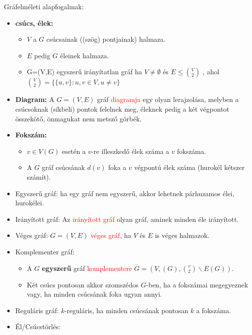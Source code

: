 \documentclass[../../szobeli.tex]{subfiles}
\begin{document}
\begin{center}
    \noindent{}
\end{center}

    Gráfelméleti alapfogalmak: 
    
    \begin{itemize}
        \item \textbf{csúcs, élek:} \begin{itemize}
            \item $V$ a $G$ csúcsainak ((szög) pontjainak) halmaza.
            \item $E$ pedig $G$ éleinek halmaza.
            \item G=(V,E) egyszerű irányítatlan gráf ha $V \neq \emptyset$ és $E \leq \binom{V}{2}$ , ahol $\binom{V}{2} = \{\{u,v\}:u,v\in V,u\neq v\}$
        \end{itemize} 
        \item \textbf{Diagram:} A $G = (V,E)$ gráf \textcolor{red}{diagramja} egy olyan lerajzolása, melyben a csúcsoknak (síkbeli) pontok felelnek meg, éleknek pedig a két végpontot összekötő, önmagukat nem metsző görbék.
        \item \textbf{Fokszám:}\begin{itemize}
            \item $v \in V(G)$ esetén a $v$-re illeszkedő élek száma a $v$ fokszáma.
            \item A $G$ gráf csúcsának $d(v)$ foka a $v$ végpontú élek száma (hurokél kétszer számít).
        \end{itemize}
        \item Egyszerű gráf: ha egy gráf nem egyszerű, akkor lehetnek párhuzamos élei, hurokélei.
        \item Irányított gráf: Az \textcolor{red}{irányított gráf} olyan gráf, aminek minden éle irányított.
        \item Véges gráf: $G = (V,E)$ \textcolor{red}{véges gráf}, ha $V$ és $E$ is véges halmazok.
        \item Komplementer gráf: \begin{itemize}
            \item A $G$ \textbf{egyszerű} gráf \textcolor{red}{komplementere} $\overline{G} = (V,(G), \binom{v}{2} \backslash E(G))$.
            \item Két csúcs pontosan akkor szomszédos $G$-ben, ha a fokszámai megegyeznek vagy, ha minden csúcsának foka ugyan annyi.
        \end{itemize}
        \item Reguláris gráf: $k$-reguláris, ha minden csúcsának pontosan $k$ a fokszáma.
        \item Él/Csúcstörlés: 
        

\end{itemize}
\end{document}
